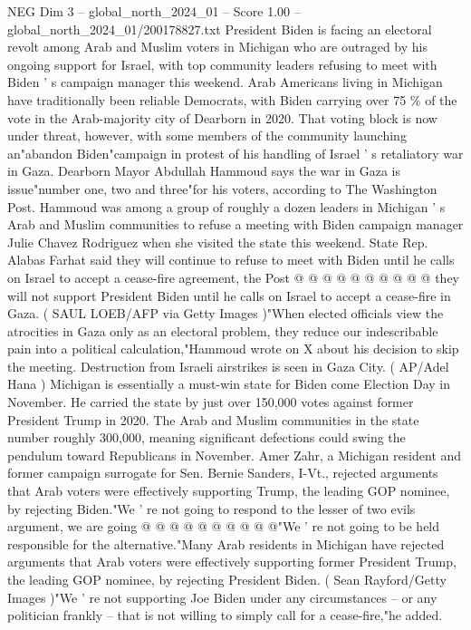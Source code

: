 \begin{textsample}{NEG Dim 3 – global\_north\_2024\_01 – Score 1.00 – global\_north\_2024\_01/200178827.txt}  \label{ex:f3_neg_236}
President Biden is facing an electoral revolt among Arab and Muslim voters in Michigan who are outraged by his ongoing support for Israel, with top community leaders refusing to meet with Biden ' s campaign manager this weekend.
Arab Americans living in Michigan have traditionally been reliable Democrats, with Biden carrying over 75 \% of the vote in the Arab-majority city of Dearborn in 2020.
That voting block is now under threat, however, with some members of the community launching an"abandon Biden"campaign in protest of his handling of Israel ' s retaliatory war in Gaza.
Dearborn Mayor Abdullah Hammoud says the war in Gaza is issue"number one, two and three"for his voters, according to The Washington Post.
Hammoud was among a group of roughly a dozen leaders in Michigan ' s Arab and Muslim communities to refuse a meeting with Biden campaign manager Julie Chavez Rodriguez when she visited the state this weekend.
State Rep.
Alabas Farhat said they will continue to refuse to meet with Biden until he calls on Israel to accept a cease-fire agreement, the Post @ @ @ @ @ @ @ @ @ @ they will not support President Biden until he calls on Israel to accept a cease-fire in Gaza. ( SAUL LOEB/AFP via Getty Images )"When elected officials view the atrocities in Gaza only as an electoral problem, they reduce our indescribable pain into a political calculation,"Hammoud wrote on X about his decision to skip the meeting.
Destruction from Israeli airstrikes is seen in Gaza City. ( AP/Adel Hana ) Michigan is essentially a must-win state for Biden come Election Day in November.
He carried the state by just over 150,000 votes against former President Trump in 2020.
The Arab and Muslim communities in the state number roughly 300,000, meaning significant defections could swing the pendulum toward Republicans in November.
Amer Zahr, a Michigan resident and former campaign surrogate for Sen.
Bernie Sanders, I-Vt., rejected arguments that Arab voters were effectively supporting Trump, the leading GOP nominee, by rejecting Biden."We ' re not going to respond to the lesser of two evils argument, we are going @ @ @ @ @ @ @ @ @ @"We ' re not going to be held responsible for the alternative."Many Arab residents in Michigan have rejected arguments that Arab voters were effectively supporting former President Trump, the leading GOP nominee, by rejecting President Biden. ( Sean Rayford/Getty Images )"We ' re not supporting Joe Biden under any circumstances -- or any politician frankly -- that is not willing to simply call for a cease-fire,"he added.

\end{textsample}
